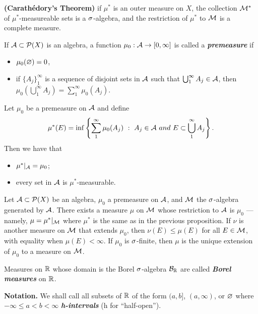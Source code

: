 \vs 

\begin{thm}\label{thm: Carathedory}\textbf{(Carath\'edory's Theorem)}
if $\mu^*$ is an outer measure on $X$, the collection $\mathcal{M}^*$ of $\mu^*$-measureable sets is a $\sigma$-algebra, and the restriction of $\mu^*$ to $\mathcal{M}$ is a complete measure.
\end{thm}

\vs 

\dfn If $\mathcal{A}\subset \mathcal{P}(X)$ is an algebra, a function $\mu_0:\mathcal{A}\rightarrow [0,\infty]$ is called a \textit{\textbf{premeasure}} if 
\begin{itemize}
\item $\mu_0(\varnothing) = 0$,
\item if $\{A_j\}_1^\infty$ is a sequence of disjoint sets in $\mathcal{A}$ such that $\bigcup_1^\infty A_j\in \mathcal{A}$, then $\mu_0(\bigcup_1^\infty A_j) = \sum_1^\infty \mu_0(A_j)$.
\end{itemize}

\vs\vs

\setcounter{thm}{12}
\begin{prop}
Let $\mu_0$ be a premeasure on $\mathcal{A}$ and define
\[\mu^*(E) = \inf\left\{\sum_1^\infty \mu_0(A_j)\ :\ A_j\in \mathcal{A}\ and\ E\subset\bigcup_1^\infty A_j\right\}.\]
Then we have that
\begin{itemize}
\item $\mu^*|_{\mathcal{A}} = \mu_0$;
\item every set in $\mathcal{A}$ is $\mu^*$-measurable.
\end{itemize}
\end{prop}

\vs 

\begin{thm}
Let $\mathcal{A}\subset \mathcal{P}(X)$ be an algebra, $\mu_0$ a premeasure on $\mathcal{A}$, and $\mathcal{M}$ the $\sigma$-algebra generated by $\mathcal{A}$. There exists a measure $\mu$ on $\mathcal{M}$ whose restriction to $\mathcal{A}$ is $\mu_0$ --- namely, $\mu = \mu^*|_{\mathcal{M}}$ where $\mu^*$ is the same as in the previous proposition. If $\nu$ is another measure on $\mathcal{M}$ that extends $\mu_0$, then $\nu(E)\leq \mu(E)$ for all $E\in \mathcal{M}$, with equality when $\mu(E) < \infty$. If $\mu_0$ is $\sigma$-finite, then $\mu$ is the unique extension of $\mu_0$ to a measure on $\mathcal{M}$.
\end{thm}

\vs 

\dfn Measures on $\mathbb{R}$ whose domain is the Borel $\sigma$-algebra $\mathcal{B}_{\mathbb{R}}$ are called \textbf{\textit{Borel measures}} on $\mathbb{R}$.

\textbf{Notation.} We shall call all subsets of $\mathbb{R}$ of the form $(a,b]$, $(a,\infty)$, or $\varnothing$ where $-\infty\leq a < b < \infty$ \textit{\textbf{h-intervals}} (h for ``half-open'').

